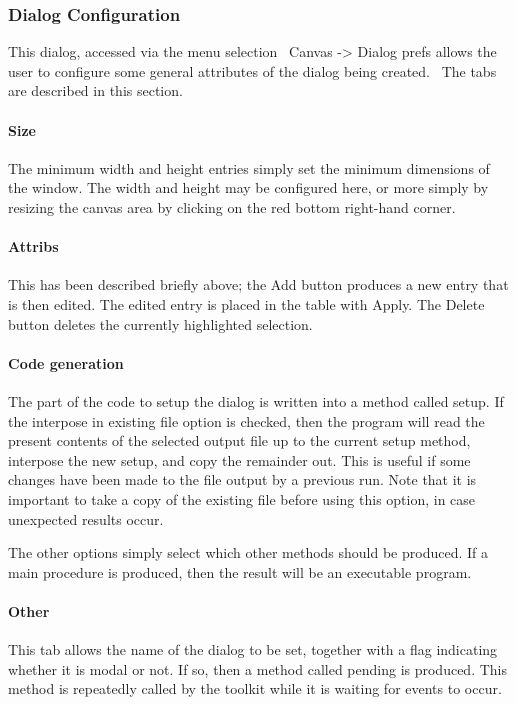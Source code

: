 \subsubsection{Dialog Configuration}

This dialog, accessed via the menu selection \ \textsf{Canvas
-{\textgreater} Dialog prefs} allows the user to configure some general
attributes of the dialog being created. \ The tabs are described in
this section.

\paragraph{Size}
The minimum width and height entries simply set the minimum dimensions
of the window. The width and height may be configured here, or more
simply by resizing the canvas area by clicking on the red bottom
right-hand corner.

\paragraph[Attribs]{Attribs}
This has been described briefly above; the Add button produces a new
entry that is then edited. The edited entry is placed in the table with
Apply. The Delete button deletes the currently highlighted selection.

\paragraph{Code generation}
The part of the code to setup the dialog is written into a method called
setup. If the {\textquotedbl}interpose in existing file{\textquotedbl}
option is checked, then the program will read the present contents of
the selected output file up to the current setup method, interpose the
new setup, and copy the remainder out. This is useful if some changes
have been made to the file output by a previous run. Note that it is
important to take a copy of the existing file before using this option,
in case unexpected results occur.

The other options simply select which other methods should be produced.
If a main procedure is produced, then the result will be an executable
program.

\paragraph{Other}
This tab allows the name of the dialog to be set, together with a flag
indicating whether it is {\textquotedbl}modal{\textquotedbl} or not. If
so, then a method called pending is produced. This method is repeatedly
called by the toolkit while it is waiting for events to occur.

